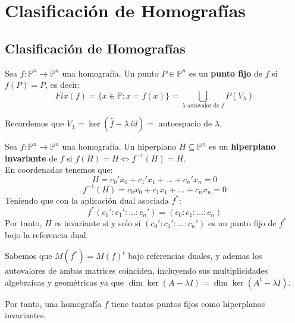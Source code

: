 \section{Clasificación de Homografías}
\subsection{Clasificación de Homografías}

\begin{definición}
    Sea $f: \mathbb{P}^n \to \mathbb{P}^n$ una homografía. Un punto $P \in \mathbb{P}^n$ es un \textbf{punto fijo} de $f$ si $f(P) = P$, es decir:
    \[
    Fix(f) =
    \{ x \in \mathbb{P} : x = f(x) \} =
    \bigcup_{\lambda \text{ autovalor de } f} P(V_{\lambda})
    \]
\end{definición}

Recordemos que $V_{\lambda} = \ker(\hat{f} - \lambda \, id) = \text{ autoespacio de } \lambda$.

\begin{definición}
    Sea $f: \mathbb{P}^n \to \mathbb{P}^n$ una homografía. Un hiperplano $H \subseteq \mathbb{P}^n$ es un \textbf{hiperplano invariante} de $f$ si $f(H) = H \iff f^{-1}(H) = H$.\\
    En coordenadas tenemos que:
    \[
    H = c_0'x_0 + c_1'x_1 + \ldots + c_n'x_n = 0
    \]
    \[
    f^{-1}(H) = c_0x_0 + c_1x_1 + \ldots +c_nx_n = 0
    \]
    Teniendo que con la aplicación dual asociada $f^*$:
    \[
    f^* (c_0' : c_1' : \ldots : c_n') = (c_0 : c_1 : \ldots : c_n)
    \]
    Por tanto, $H$ es invariante si y solo si $(c_0' : c_1' : \ldots : c_n')$ es un punto fijo de $f^*$ bajo la referencia dual.
\end{definición}

Sabemos que $M(f^*) = M(f)^t$ bajo referencias duales, y ademas los autovalores de ambas matrices coinciden, incluyendo sus multiplicidades algebraicas y geométricas ya que $\dim \ker (A - \lambda I) = \dim \ker (A^t - \lambda I)$.

Por tanto, una homografía $f$ tiene tantos puntos fijos como hiperplanos invariantes.


